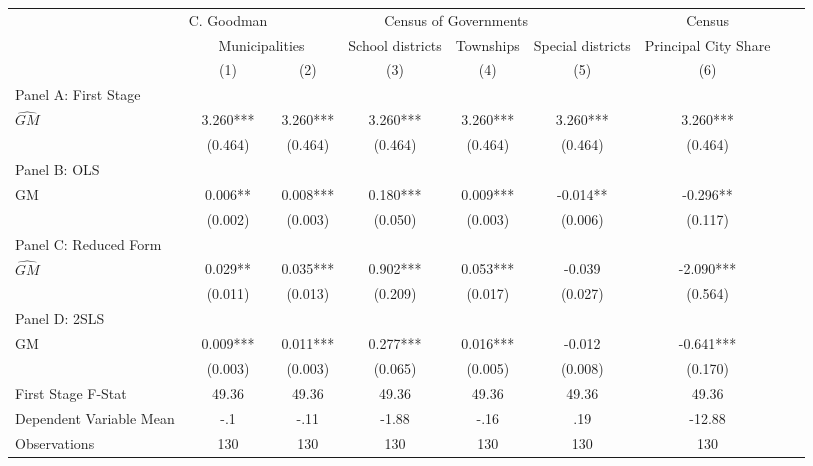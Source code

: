  \begin{tabular}{l*{8}{c}} \toprule
&\multicolumn{1}{c}{C. Goodman}&\multicolumn{4}{c}{Census of Governments}&\multicolumn{1}{c}{Census}\\\cmidrule(lr){2-2}\cmidrule(lr){3-6}\cmidrule(lr){7-7}
&\multicolumn{2}{c}{Municipalities}&\multicolumn{1}{c}{School districts}&\multicolumn{1}{c}{Townships}&\multicolumn{1}{c}{Special districts}&\multicolumn{1}{c}{Principal City Share}\\\cmidrule(lr){2-3}\cmidrule(lr){4-6}\cmidrule(lr){7-7}
&\multicolumn{1}{c}{(1)}&\multicolumn{1}{c}{(2)}&\multicolumn{1}{c}{(3)}&\multicolumn{1}{c}{(4)}&\multicolumn{1}{c}{(5)}&\multicolumn{1}{c}{(6)}\\
\cmidrule(lr){1-7}
\multicolumn{6}{l}{Panel A: First Stage}\\
\cmidrule(lr){1-7}
$\widehat{GM}$  &    3.260***&    3.260***&    3.260***&    3.260***&    3.260***&    3.260***\\
                &  (0.464)   &  (0.464)   &  (0.464)   &  (0.464)   &  (0.464)   &  (0.464)   \\
\cmidrule(lr){1-7}
\multicolumn{6}{l}{Panel B: OLS}\\
\cmidrule(lr){1-7}
GM              &    0.006** &    0.008***&    0.180***&    0.009***&   -0.014** &   -0.296** \\
                &  (0.002)   &  (0.003)   &  (0.050)   &  (0.003)   &  (0.006)   &  (0.117)   \\
\cmidrule(lr){1-7}
\multicolumn{6}{l}{Panel C: Reduced Form}\\
\cmidrule(lr){1-7}
$\widehat{GM}$  &    0.029** &    0.035***&    0.902***&    0.053***&   -0.039   &   -2.090***\\
                &  (0.011)   &  (0.013)   &  (0.209)   &  (0.017)   &  (0.027)   &  (0.564)   \\
\cmidrule(lr){1-7}
\multicolumn{6}{l}{Panel D: 2SLS}\\
\cmidrule(lr){1-7}
GM              &    0.009***&    0.011***&    0.277***&    0.016***&   -0.012   &   -0.641***\\
                &  (0.003)   &  (0.003)   &  (0.065)   &  (0.005)   &  (0.008)   &  (0.170)   \\
\midrule
First Stage F-Stat&    49.36   &    49.36   &    49.36   &    49.36   &    49.36   &    49.36   \\
Dependent Variable Mean&      -.1   &     -.11   &    -1.88   &     -.16   &      .19   &   -12.88   \\
Observations    &      130   &      130   &      130   &      130   &      130   &      130   \\
       \bottomrule \end{tabular}
